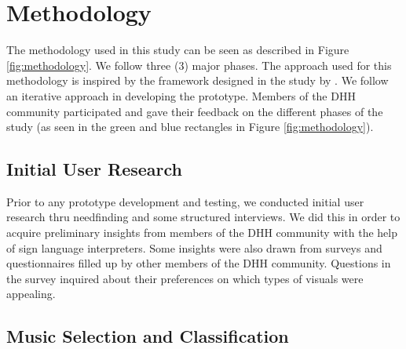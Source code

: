 \documentclass{sigchi-ext}
\begin{document}
\section{Methodology}
The methodology used in this study can be seen as described in Figure \ref{fig:methodology}.  We follow three (3) major phases. The approach used for this methodology is inspired by the framework designed in the study by \cite{deja2018flow}. We follow an iterative approach in developing the prototype. Members of the DHH community participated and gave their feedback on the different phases of the study (as seen in the green and blue rectangles in Figure \ref{fig:methodology}).

\subsection{Initial User Research}
Prior to any prototype development and testing, we conducted initial user research thru needfinding and some structured interviews. We did this in order to acquire preliminary insights from members of the DHH community with the help of sign language interpreters. Some insights were also drawn from surveys and questionnaires filled up by other members of the DHH community.  Questions in the survey inquired about their preferences on which types of visuals were appealing.





\subsection{Music Selection and Classification}
\end{document}
